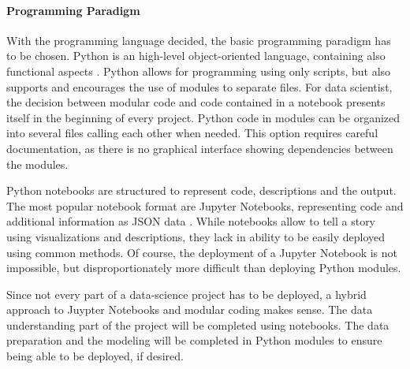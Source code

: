\paragraph{Programming Paradigm}
With the programming language decided, the basic programming paradigm has to be chosen. Python is an high-level object-oriented language, containing also functional aspects \cite[ch.~1.3.2]{corePython}. Python allows for programming using only scripts, but also supports and encourages the use of modules to separate files.
For data scientist, the decision between modular code and code contained in a notebook presents itself in the beginning of every project. Python code in modules can be organized into several files calling each other when needed. This option requires careful documentation, as there is no graphical interface showing dependencies between the modules.

Python notebooks are structured to represent code, descriptions and the output. The most popular notebook format are Jupyter Notebooks, representing code and additional information as \ac{JSON} data \cite{jupyterteamArchitecture}.
While notebooks allow to tell a story using visualizations and descriptions, they lack in ability to be easily deployed using common methods. Of course, the deployment of a Jupyter Notebook is not impossible, but disproportionately more difficult than deploying Python modules.

Since not every part of a data-science project has to be deployed, a hybrid approach to Juypter Notebooks and modular coding makes sense. The data understanding part of the project will be completed using notebooks. The data preparation and the modeling will be completed in Python modules to ensure being able to be deployed, if desired.












